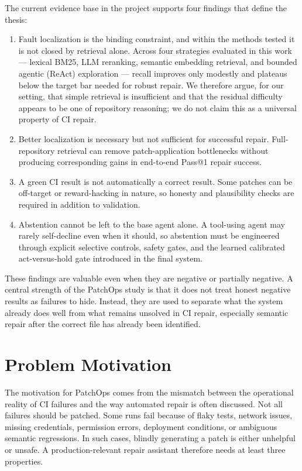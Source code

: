 The current evidence base in the project supports four findings that define the thesis:

\begin{enumerate}
\item Fault localization is the binding constraint, and within the methods tested it is not closed by retrieval
alone. Across four strategies evaluated in this work --- lexical BM25, LLM reranking, semantic embedding
retrieval, and bounded agentic (ReAct) exploration --- recall improves only modestly and plateaus below the
target bar needed for robust repair. We therefore argue, for our setting, that simple retrieval is insufficient
and that the residual difficulty appears to be one of repository reasoning; we do not claim this as a universal
property of CI repair.
\item Better localization is necessary but not sufficient for successful repair. Full-repository retrieval can
remove patch-application bottlenecks without producing corresponding gains in end-to-end Pass@1 repair success.
\item A green CI result is not automatically a correct result. Some patches can be off-target or reward-hacking
in nature, so honesty and plausibility checks are required in addition to validation.
\item Abstention cannot be left to the base agent alone. A tool-using agent may rarely self-decline even when it
should, so abstention must be engineered through explicit selective controls, safety gates, and the learned
calibrated act-versus-hold gate introduced in the final system.
\end{enumerate}

These findings are valuable even when they are negative or partially negative. A central strength of the
PatchOps study is that it does not treat honest negative results as failures to hide. Instead, they are used to
separate what the system already does well from what remains unsolved in CI repair, especially semantic repair
after the correct file has already been identified.

\section{Problem Motivation}

The motivation for PatchOps comes from the mismatch between the operational reality of CI failures and the way
automated repair is often discussed. Not all failures should be patched. Some runs fail because of flaky tests,
network issues, missing credentials, permission errors, deployment conditions, or ambiguous semantic
regressions. In such cases, blindly generating a patch is either unhelpful or unsafe. A production-relevant
repair assistant therefore needs at least three properties.

